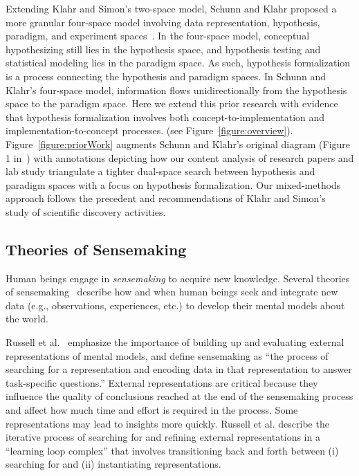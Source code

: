Extending Klahr and Simon's two-space model, Schunn and Klahr proposed a more
granular four-space model involving data representation, hypothesis, paradigm,
and experiment spaces~\cite{schunn1995FourSpace,schunn1996BeyondTwoSpace}. In the four-space model, conceptual hypothesizing still lies in the
hypothesis space, and hypothesis testing and statistical modeling lies in the
paradigm space. As such, hypothesis formalization is a process connecting
the hypothesis and paradigm spaces. In Schunn and Klahr's four-space model,
information flows unidirectionally from the hypothesis space to the paradigm space.
Here we extend this prior research with
evidence that hypothesis formalization involves both
concept-to-implementation and implementation-to-concept processes. (see
Figure~\ref{figure:overview}).
Figure~\ref{figure:priorWork} augments Schunn and Klahr's
original diagram (Figure 1 in~\cite{schunn1995FourSpace}) with
annotations depicting how our content analysis of research papers and lab study
triangulate a tighter dual-space search between hypothesis and
paradigm spaces with a focus on hypothesis formalization. Our mixed-methods
approach follows the precedent and recommendations of Klahr and
Simon's~\cite{klahr1999studies} study of scientific discovery activities.

\figurePriorWorkCombined

\subsection{Theories of Sensemaking}
Human beings engage in \textit{sensemaking} to acquire new knowledge. Several
theories of
sensemaking~\cite{pirolli2005sensemaking,russell1993cost,klein2007dataFrame}
describe how and when human beings seek and integrate new data (e.g.,
observations, experiences, etc.) to develop their mental models about the world.

Russell et al.~\cite{russell1993cost} emphasize the importance of building up
and evaluating external representations of mental models, and define sensemaking
as ``the process of searching for a representation and encoding data in that
representation to answer task-specific questions.'' External representations are
critical because they influence the quality of conclusions reached at the end of
the sensemaking process and affect how much time and effort is required in the process. Some representations
may lead to insights more quickly. Russell et al. describe the iterative
process of searching for and refining external representations in a ``learning
loop complex'' that involves transitioning back and forth between (i) searching
for and (ii) instantiating representations. 
 
